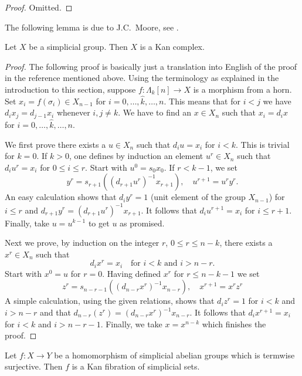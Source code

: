 \begin{proof}
Omitted.
\end{proof}

\noindent
The following lemma is due to J.C.\ Moore, see \cite{Moore-Cartan}.

\begin{lemma}
\label{lemma-simplicial-group-kan}
Let $X$ be a simplicial group. Then $X$ is a Kan complex.
\end{lemma}

\begin{proof}
The following proof is basically just a translation into English
of the proof in the reference mentioned above.
Using the terminology as explained in the introduction to this section,
suppose $f : \Lambda_k[n] \to X$ is a morphism from a horn. Set
$x_i = f(\sigma_i) \in X_{n - 1}$ for $i = 0, \ldots, \hat k, \ldots, n$.
This means that for $i < j$ we have $d_i x_j = d_{j - 1} x_i$
whenever $i, j \not = k$.
We have to find an $x \in X_n$ such that $x_i = d_ix$ for
$i = 0, \ldots, \hat k, \ldots, n$.

\medskip\noindent
We first prove there exists a $u \in X_n$ such that $d_i u = x_i$
for $i < k$. This is trivial for $k = 0$. If $k > 0$, one defines by
induction an element $u^r \in X_n$ such that $d_i u^r = x_i$ for
$0 \leq i \leq r$. Start with $u^0 = s_0x_0$. If $r < k - 1$,
we set
$$
y^r = s_{r + 1}((d_{r + 1}u^r)^{-1}x_{r + 1}),\quad
u^{r + 1} = u^r y^r.
$$
An easy calculation shows that $d_iy^r = 1$ (unit element of the group
$X_{n - 1}$) for $i \leq r$ and
$d_{r + 1}y^r = (d_{r + 1}u^r)^{-1}x_{r + 1}$. It follows that
$d_iu^{r + 1} = x_i$ for $i \leq r + 1$. Finally, take $u = u^{k - 1}$
to get $u$ as promised.

\medskip\noindent
Next we prove, by induction on the integer $r$, $0 \leq r \leq n - k$,
there exists a $x^r \in X_n$ such that
$$
d_i x^r = x_i\quad\text{for }i < k\text{ and }i > n - r.
$$
Start with $x^0 = u$ for $r = 0$. Having defined $x^r$ for $r \leq n - k - 1$
we set
$$
z^r = s_{n - r - 1}((d_{n - r}x^r)^{-1}x_{n - r}),\quad x^{r + 1} = x^rz^r
$$
A simple calculation, using the given relations, shows that
$d_iz^r = 1$ for $i < k$ and $i > n - r$ and that
$d_{n - r}(z^r) = (d_{n - r}x^r)^{-1}x_{n - r}$. It follows that
$d_ix^{r + 1} = x_i$ for $i < k$ and $i > n - r - 1$. Finally, we
take $x = x^{n - k}$ which finishes the proof.
\end{proof}

\begin{lemma}
\label{lemma-surjection-simplicial-abelian-groups-kan}
Let $f : X \to Y$ be a homomorphism of simplicial abelian groups
which is termwise surjective. Then $f$ is a Kan fibration of
simplicial sets.
\end{lemma}

